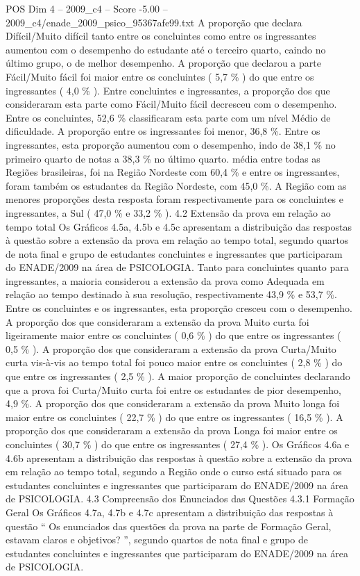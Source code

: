 \begin{textsample}{POS Dim 4 – 2009\_c4 – Score -5.00 – 2009\_c4/enade\_2009\_psico\_95367afe99.txt}
A proporção que declara Difícil/Muito difícil tanto entre os concluintes como entre os ingressantes aumentou com o desempenho do estudante até o terceiro quarto, caindo no último grupo, o de melhor desempenho.
A proporção que declarou a parte Fácil/Muito fácil foi maior entre os concluintes ( 5,7 \% ) do que entre os ingressantes ( 4,0 \% ).
Entre concluintes e ingressantes, a proporção dos que consideraram esta parte como Fácil/Muito fácil decresceu com o desempenho.
Entre os concluintes, 52,6 \% classificaram esta parte com um nível Médio de dificuldade.
A proporção entre os ingressantes foi menor, 36,8 \%.
Entre os ingressantes, esta proporção aumentou com o desempenho, indo de 38,1 \% no primeiro quarto de notas a 38,3 \% no último quarto. média entre todas as Regiões brasileiras, foi na Região Nordeste com 60,4 \% e entre os ingressantes, foram também os estudantes da Região Nordeste, com 45,0 \%.
A Região com as menores proporções desta resposta foram respectivamente para os concluintes e ingressantes, a Sul ( 47,0 \% e 33,2 \% ). 4.2 Extensão da prova em relação ao tempo total Os Gráficos 4.5a, 4.5b e 4.5c apresentam a distribuição das respostas à questão sobre a extensão da prova em relação ao tempo total, segundo quartos de nota final e grupo de estudantes concluintes e ingressantes que participaram do ENADE/2009 na área de PSICOLOGIA.
Tanto para concluintes quanto para ingressantes, a maioria considerou a extensão da prova como Adequada em relação ao tempo destinado à sua resolução, respectivamente 43,9 \% e 53,7 \%.
Entre os concluintes e os ingressantes, esta proporção cresceu com o desempenho.
A proporção dos que consideraram a extensão da prova Muito curta foi ligeiramente maior entre os concluintes ( 0,6 \% ) do que entre os ingressantes ( 0,5 \% ).
A proporção dos que consideraram a extensão da prova Curta/Muito curta vis-à-vis ao tempo total foi pouco maior entre os concluintes ( 2,8 \% ) do que entre os ingressantes ( 2,5 \% ).
A maior proporção de concluintes declarando que a prova foi Curta/Muito curta foi entre os estudantes de pior desempenho, 4,9 \%.
A proporção dos que consideraram a extensão da prova Muito longa foi maior entre os concluintes ( 22,7 \% ) do que entre os ingressantes ( 16,5 \% ).
A proporção dos que consideraram a extensão da prova Longa foi maior entre os concluintes ( 30,7 \% ) do que entre os ingressantes ( 27,4 \% ).
Os Gráficos 4.6a e 4.6b apresentam a distribuição das respostas à questão sobre a extensão da prova em relação ao tempo total, segundo a Região onde o curso está situado para os estudantes concluintes e ingressantes que participaram do ENADE/2009 na área de PSICOLOGIA. 4.3 Compreensão dos Enunciados das Questões 4.3.1 Formação Geral Os Gráficos 4.7a, 4.7b e 4.7c apresentam a distribuição das respostas à questão “ Os enunciados das questões da prova na parte de Formação Geral, estavam claros e objetivos? ”, segundo quartos de nota final e grupo de estudantes concluintes e ingressantes que participaram do ENADE/2009 na área de PSICOLOGIA.

\end{textsample}
